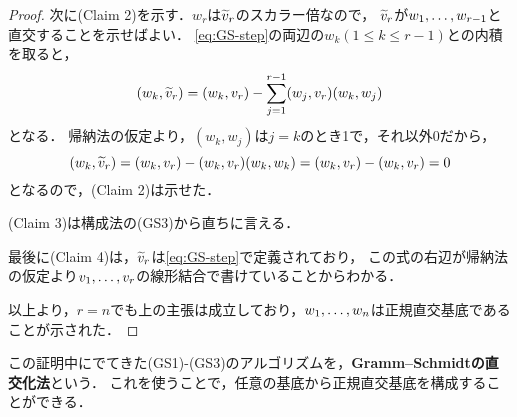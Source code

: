 \begin{proof}
次に(Claim 2)を示す．$w_r$は$\widetilde{v}_r$のスカラー倍なので，
$\widetilde{v}_r$が$w_{1},\dots,w_{r-1}$と直交することを示せばよい．
\eqref{eq:GS-step}の両辺の$w_k (1\le k \le r-1)$との内積を取ると，
\[
    (w_k,\widetilde{v}_r) = (w_k,v_r) - \sum_{j=1}^{r-1} (w_j,v_r) (w_k,w_j) 
\]
となる．
帰納法の仮定より，$(w_k,w_j)$は$j=k$のとき1で，それ以外0だから，
\[
    (w_k,\widetilde{v}_r) = (w_k,v_r) - (w_k,v_r) (w_k,w_k) = (w_k,v_r) - (w_k,v_r) = 0
\]
となるので，(Claim 2)は示せた．

(Claim 3)は構成法の(GS3)から直ちに言える．

最後に(Claim 4)は，$\widetilde{v}_r$は\eqref{eq:GS-step}で定義されており，
この式の右辺が帰納法の仮定より$v_{1},\dots,v_{r}$の線形結合で書けていることからわかる．

以上より，$r=n$でも上の主張は成立しており，$w_{1},\dots,w_{n}$は正規直交基底であることが示された．
\end{proof}
この証明中にでてきた(GS1)-(GS3)のアルゴリズムを，\textbf{Gramm--Schmidtの直交化法}という．
これを使うことで，任意の基底から正規直交基底を構成することができる．
